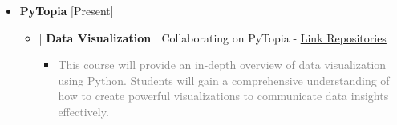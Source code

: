 \documentclass[10pt,a4paper,sans]{moderncv} %
\begin{document}
               \begin{itemize}
		\item {} \textbf{PyTopia }     \hfill[Present]
		\vspace{0.5em}

      \begin{itemize}
       \item{} | \textbf{Data Visualization} | Collaborating on PyTopia  - \href{https://github.com/pytopia/Python-2023}{Link Repositories}
        
		\begin{itemize}
			\item \textcolor{gray}{This course will provide an in-depth overview of data visualization using Python. Students will gain a comprehensive understanding of how to create powerful visualizations to communicate data insights effectively.}


 

			\end{itemize}	
				
		\end{itemize}
  
		\end{itemize}




        




				
\end{document}
